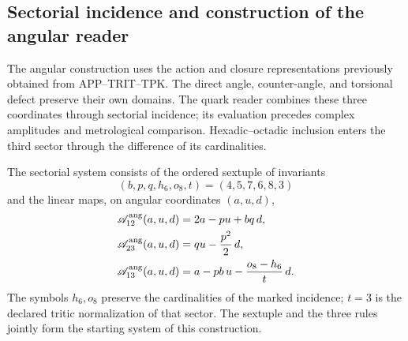 
\subsection{Sectorial incidence and construction of the angular reader}
\label{sec:ii09-construccion-sectorial}

The angular construction uses the action and closure representations
previously obtained from APP--TRIT--TPK. The direct angle,
counter-angle, and torsional defect preserve their own domains.
The quark reader combines these three coordinates through sectorial
incidence; its evaluation precedes complex amplitudes and
metrological comparison. Hexadic--octadic inclusion enters
the third sector through the difference of its cardinalities.





\begin{definition}
\label{def:ii09-sistema-sectorial}
The sectorial system consists of the ordered sextuple of invariants
\[
 (b,p,q,h_6,o_8,t)=(4,5,7,6,8,3)
\]
and the linear maps, on angular coordinates
\((a,u,d)\),
\begin{align}
 \mathscr A_{12}^{\rm ang}(a,u,d)&=2a-pu+bq\,d,\label{eq:ii09-sector12}\\
 \mathscr A_{23}^{\rm ang}(a,u,d)&=qu-\frac{p^2}{2}\,d,\label{eq:ii09-sector23}\\
 \mathscr A_{13}^{\rm ang}(a,u,d)&=a-pb\,u-\frac{o_8-h_6}{t}\,d.
 \label{eq:ii09-sector13}
\end{align}
The symbols \(h_6,o_8\) preserve the cardinalities of the marked
incidence; \(t=3\) is the declared tritic normalization of that sector.
The sextuple and the three rules jointly form the starting
system of this construction.
\end{definition}

